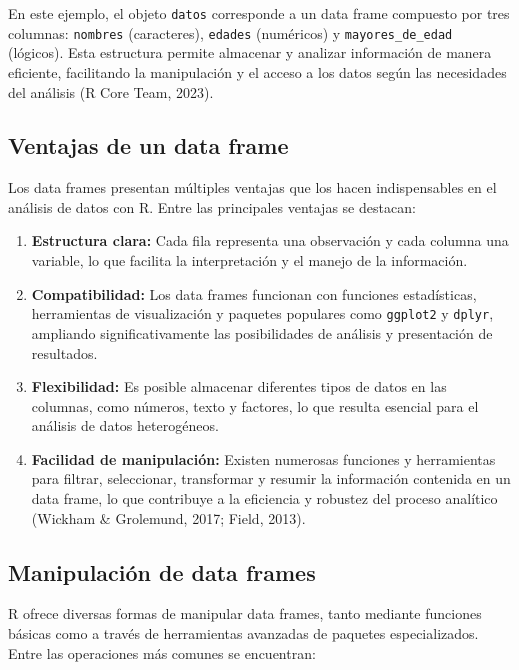 \documentclass[
  spanish,
  a4paper,
  DIV=11,
  numbers=noendperiod,
  onepage,
  openany]{scrreprt}
\begin{document}
En este ejemplo, el objeto \texttt{datos} corresponde a un data frame
compuesto por tres columnas: \texttt{nombres} (caracteres),
\texttt{edades} (numéricos) y \texttt{mayores\_de\_edad} (lógicos). Esta
estructura permite almacenar y analizar información de manera eficiente,
facilitando la manipulación y el acceso a los datos según las
necesidades del análisis (R Core Team, 2023).

\subsection{Ventajas de un data frame}\label{ventajas-de-un-data-frame}

Los data frames presentan múltiples ventajas que los hacen
indispensables en el análisis de datos con R. Entre las principales
ventajas se destacan:

\begin{enumerate}
\def\labelenumi{\arabic{enumi}.}
\item
  \textbf{Estructura clara:} Cada fila representa una observación y cada
  columna una variable, lo que facilita la interpretación y el manejo de
  la información.
\item
  \textbf{Compatibilidad:} Los data frames funcionan con funciones
  estadísticas, herramientas de visualización y paquetes populares como
  \texttt{ggplot2} y \texttt{dplyr}, ampliando significativamente las
  posibilidades de análisis y presentación de resultados.
\item
  \textbf{Flexibilidad:} Es posible almacenar diferentes tipos de datos
  en las columnas, como números, texto y factores, lo que resulta
  esencial para el análisis de datos heterogéneos.
\item
  \textbf{Facilidad de manipulación:} Existen numerosas funciones y
  herramientas para filtrar, seleccionar, transformar y resumir la
  información contenida en un data frame, lo que contribuye a la
  eficiencia y robustez del proceso analítico (Wickham \& Grolemund,
  2017; Field, 2013).
\end{enumerate}

\subsection{Manipulación de data
frames}\label{manipulaciuxf3n-de-data-frames}

R ofrece diversas formas de manipular data frames, tanto mediante
funciones básicas como a través de herramientas avanzadas de paquetes
especializados. Entre las operaciones más comunes se encuentran:
\end{document}
